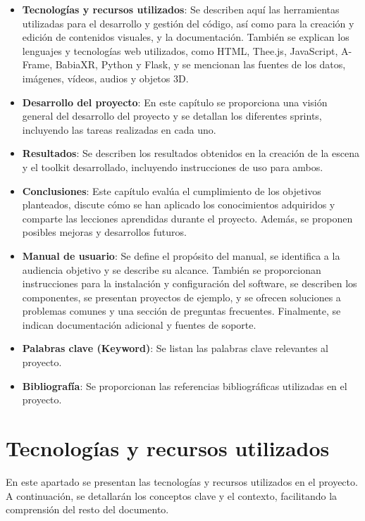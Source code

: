 \documentclass[a4paper, 12pt]{book}
\begin{document}
\begin{itemize}
    \item \textbf{Tecnologías y recursos utilizados}: 
Se describen aquí las herramientas utilizadas para el desarrollo y gestión del código, así como para la creación y edición de contenidos visuales, y la documentación. También se explican los lenguajes y tecnologías web utilizados, como HTML, Thee.js, JavaScript, A-Frame, BabiaXR, Python y Flask, y se mencionan las fuentes de los datos, imágenes, vídeos, audios y objetos 3D.
    \item \textbf{Desarrollo del proyecto}: En este capítulo se proporciona una visión general del desarrollo del proyecto y se detallan los diferentes sprints, incluyendo las tareas realizadas en cada uno.
    \item \textbf{Resultados}: Se describen los resultados obtenidos en la creación de la escena y el toolkit desarrollado, incluyendo instrucciones de uso para ambos.
    \item \textbf{Conclusiones}: Este capítulo evalúa el cumplimiento de los objetivos planteados, discute cómo se han aplicado los conocimientos adquiridos y comparte las lecciones aprendidas durante el proyecto. Además, se proponen posibles mejoras y desarrollos futuros.
    \item \textbf{Manual de usuario}: Se define el propósito del manual, se identifica a la audiencia objetivo y se describe su alcance. También se proporcionan instrucciones para la instalación y configuración del software, se describen los componentes, se presentan proyectos de ejemplo, y se ofrecen soluciones a problemas comunes y una sección de preguntas frecuentes. Finalmente, se indican documentación adicional y fuentes de soporte.
    \item \textbf{Palabras clave (Keyword)}: Se listan las palabras clave relevantes al proyecto.
    \item \textbf{Bibliografía}: Se proporcionan las referencias bibliográficas utilizadas en el proyecto.
\end{itemize}


\chapter{Tecnologías y recursos utilizados}
\label{chap:tecnologías}

En este apartado se presentan las tecnologías y recursos utilizados en el proyecto. A continuación, se detallarán los conceptos clave y el contexto, facilitando la comprensión del resto del documento.
\end{document}

